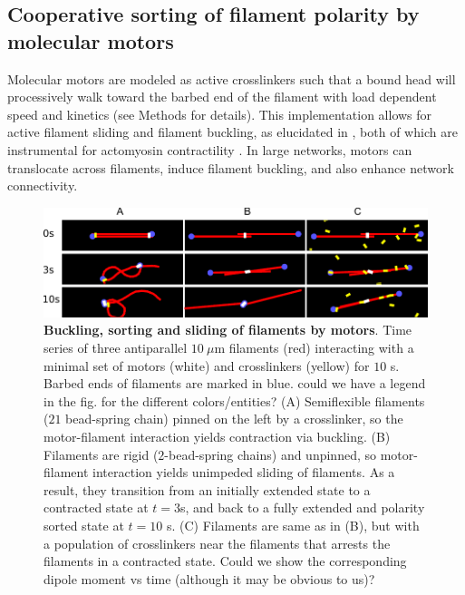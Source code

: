 \documentclass[11pt]{article}
\begin{document}
\subsection*{{\color{blue}Cooperative} sorting of filament polarity by molecular motors}
{\color{red}Molecular} motors are modeled as {\color{red}active} crosslinkers {\color{red}such} that a bound head will processively {\color{red}walk} toward the barbed end of the filament {\color{red}with load dependent speed and kinetics} (see Methods for details). 
This implementation allows for {\color{red}active} filament sliding and filament buckling, as {\color{red}elucidated} in , 
both of which are instrumental for actomyosin contractility \cite{murrell2012}.
In large networks, motors can translocate across filaments, {\color{red}induce filament buckling}, and {\color{red}also enhance} network connectivity\cite{murrell2014}. 
\begin{figure}[H]
  \centering
  \includegraphics[width=\textwidth]{figs/minimal.pdf}
  \caption{\label{fig:slide}
  \label{fig:toys}%
  {\bf Buckling, sorting and sliding of filaments by motors}. Time series of three antiparallel $10\ \mu$m filaments (red) interacting with a minimal set of motors (white) and crosslinkers ({\color{red}yellow}) for $10$ s. Barbed ends of filaments are marked in blue. {\color{blue}could we have a legend in the fig. for the different colors/entities?} 
  (A) Semiflexible filaments ($21$ bead-spring chain) pinned on the left by a crosslinker, so the motor-filament interaction yields contraction via buckling. 
  (B) Filaments are rigid ($2$-bead-spring chains) and unpinned, so motor-filament interaction yields {\color{red}unimpeded sliding of} filaments. {\color{red}As a result,} they transition from an initially extended state to a contracted state at $t=3$s, and back to a {\color{red}fully} extended and {\color{red}polarity sorted} state at $t=10$ s.
  (C) {\color{red}Filaments are} same as in (B), but with a population of crosslinkers near the filaments that {\color{red}arrests the filaments} in a contracted state. {\color{blue} Could we show the corresponding dipole moment vs time (although it may be obvious to us)?}} 
\end{figure}
\end{document}
